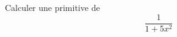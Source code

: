 Calculer une primitive de 
\begin{displaymath}
 \frac{1}{1+5x^2}
\end{displaymath}
\bigskip \bigskip